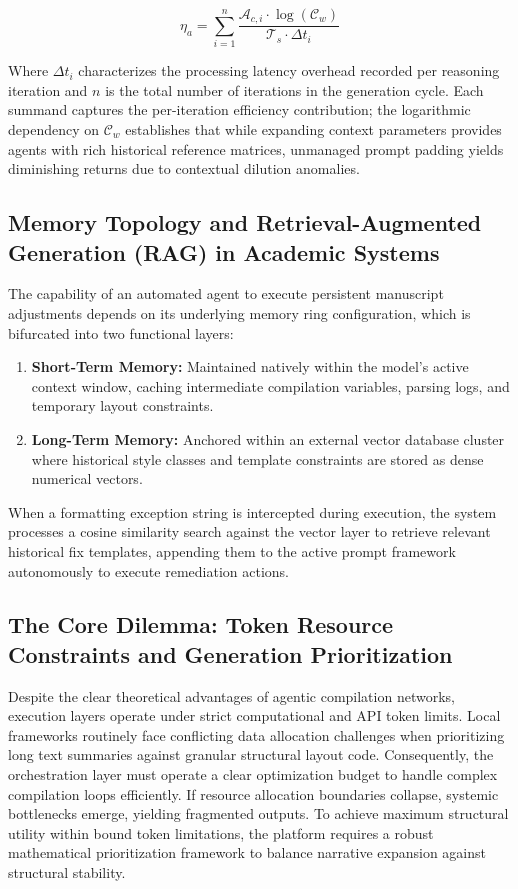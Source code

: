 $$ \eta_{a} = \sum_{i=1}^{n} \frac{\mathcal{A}_{c,i} \cdot \log(\mathcal{C}_{w})}{\mathcal{T}_{s} \cdot \Delta t_{i}} $$

Where \(\Delta t_{i}\) characterizes the processing latency overhead recorded per reasoning iteration and \(n\) is the total number of iterations in the generation cycle. Each summand captures the per-iteration efficiency contribution; the logarithmic dependency on \(\mathcal{C}_{w}\) establishes that while expanding context parameters provides agents with rich historical reference matrices, unmanaged prompt padding yields diminishing returns due to contextual dilution anomalies.

\subsection{Memory Topology and Retrieval-Augmented Generation (RAG) in Academic Systems}
The capability of an automated agent to execute persistent manuscript adjustments depends on its underlying memory ring configuration, which is bifurcated into two functional layers:
\begin{enumerate}
    \item \textbf{Short-Term Memory:} Maintained natively within the model's active context window, caching intermediate compilation variables, parsing logs, and temporary layout constraints.
    \item \textbf{Long-Term Memory:} Anchored within an external vector database cluster where historical style classes and template constraints are stored as dense numerical vectors. 
\end{enumerate}
When a formatting exception string is intercepted during execution, the system processes a cosine similarity search against the vector layer to retrieve relevant historical fix templates, appending them to the active prompt framework autonomously to execute remediation actions.

\subsection{The Core Dilemma: Token Resource Constraints and Generation Prioritization}
Despite the clear theoretical advantages of agentic compilation networks, execution layers operate under strict computational and API token limits. Local frameworks routinely face conflicting data allocation challenges when prioritizing long text summaries against granular structural layout code. Consequently, the orchestration layer must operate a clear optimization budget to handle complex compilation loops efficiently. If resource allocation boundaries collapse, systemic bottlenecks emerge, yielding fragmented outputs. To achieve maximum structural utility within bound token limitations, the platform requires a robust mathematical prioritization framework to balance narrative expansion against structural stability.

